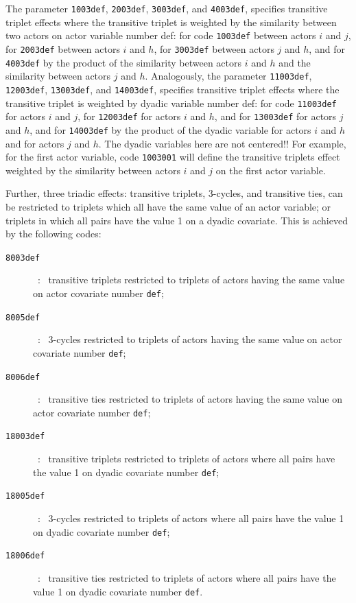 \documentclass[a4paper,fleqn]{article}
\newcommand{\+}{\, + \,}
\begin{document}
{The parameter \texttt{1003def}, \texttt{2003def}, \texttt{3003def},
and \texttt{4003def},
specifies transitive triplet effects where the transitive triplet
is weighted by the similarity between two actors
on actor variable number \textsf{def}:
for code \texttt{1003def} between actors $i$ and $j$,
for \texttt{2003def} between actors $i$ and $h$,
for \texttt{3003def} between actors $j$ and $h$, and
for \texttt{4003def} by the product of the similarity between actors $i$ and $h$
and the similarity between actors $j$ and $h$.
Analogously, the parameter \texttt{11003def}, \texttt{12003def}, \texttt{13003def},
and \texttt{14003def},
specifies transitive triplet effects where the transitive triplet
is weighted by dyadic variable number \textsf{def}:
for code \texttt{11003def} for actors $i$ and $j$,
for \texttt{12003def} for actors $i$ and $h$, and
for \texttt{13003def} for actors $j$ and $h$, and
for \texttt{14003def} by the product of the dyadic variable for actors $i$ and $h$
and for actors $j$ and $h$.
The dyadic variables here are not centered!!
For example, for the first actor variable,
code \texttt{1003001} will define the transitive triplets
effect weighted by the similarity between actors $i$ and $j$
on the first actor variable.
\bigskip

Further, three triadic effects: transitive triplets, 3-cycles,
and transitive ties, can be restricted to triplets which all have the
same value of an actor variable; or triplets in which all pairs
have the value 1 on a dyadic covariate.
This is achieved by the following codes:
\begin{description}
\item[\texttt{8003def}]\ : \ transitive triplets restricted to triplets of actors
                        having the same value on actor covariate number \texttt{def};
\item[\texttt{8005def}]\ : \  3-cycles restricted to triplets of actors
                        having the same value on actor covariate number \texttt{def};
\item[\texttt{8006def}]\ : \  transitive ties restricted to triplets of actors
                        having the same value on actor covariate number \texttt{def};
\item[\texttt{18003def}]\ : \  transitive triplets restricted to triplets of actors
                        where all pairs have the value 1 on dyadic covariate number \texttt{def};
\item[\texttt{18005def}]\ : \  3-cycles restricted to triplets of actors
                        where all pairs have the value 1 on dyadic covariate number \texttt{def};
\item[\texttt{18006def}]\ : \  transitive ties restricted to triplets of actors
                        where all pairs have the value 1 on dyadic covariate number \texttt{def}.
\end{description}


}
\end{document}
